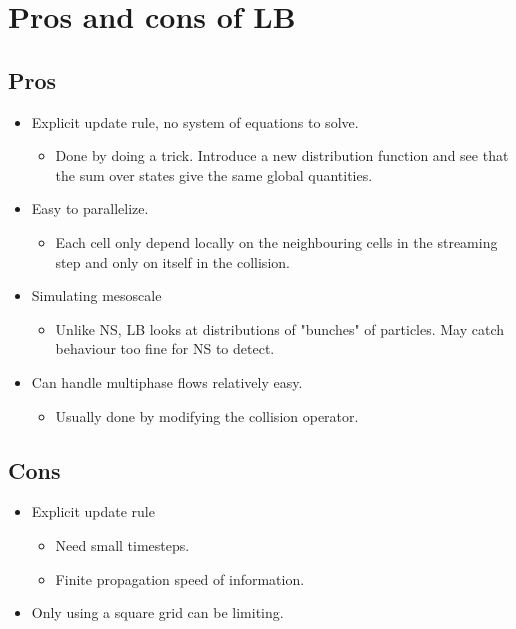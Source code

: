 \section{Pros and cons of LB}

\subsection{Pros}
\begin{itemize}
    \item Explicit update rule, no system of equations to solve.
    \begin{itemize}
        \item Done by doing a trick. Introduce a new distribution function 
              and see that the sum over states give the same global quantities.
    \end{itemize}

    \item Easy to parallelize.
        \begin{itemize}
            \item Each cell only depend locally on the neighbouring cells in
                  the streaming step and only on itself in the collision.
        \end{itemize}

    \item Simulating mesoscale
        \begin{itemize}
            \item Unlike NS, LB looks at distributions of "bunches" of
                  particles. May catch behaviour too fine for NS to detect.
        \end{itemize}
    \item Can handle multiphase flows relatively easy.
        \begin{itemize}
            \item Usually done by modifying the collision operator.
        \end{itemize}

\end{itemize}

\subsection{Cons}
\begin{itemize}
    \item Explicit update rule
        \begin{itemize}
            \item Need small timesteps.
            \item Finite propagation speed of information.
        \end{itemize}

    \item Only using a square grid can be limiting.
    

        
        
        

\end{itemize}
